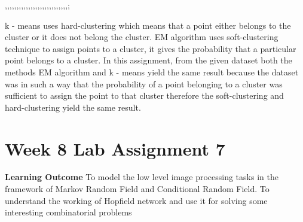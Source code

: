 ,,,,,,,,,,,,,,,,,,,,,,,,,,,;\documentclass[conference]{IEEEtran}
\begin{document}
\par k - means uses hard-clustering which means that a point
either belongs to the cluster or it does not belong the cluster.
EM algorithm uses soft-clustering technique to assign points to
a cluster, it gives the probability that a particular point belongs
to a cluster. In this assignment, from the given dataset both the
methods EM algorithm and k - means yield the same result
because the dataset was in such a way that the probability of a
point belonging to a cluster was sufficient to assign the point
to that cluster therefore the soft-clustering and hard-clustering
yield the same result.
\\
\section{Week 8 Lab Assignment 7}
\textbf{Learning Outcome} To model the low level image processing tasks in the framework of Markov Random Field and Conditional Random Field. To understand the working
of Hopfield network and use it for solving some interesting combinatorial problems
\end{document}

